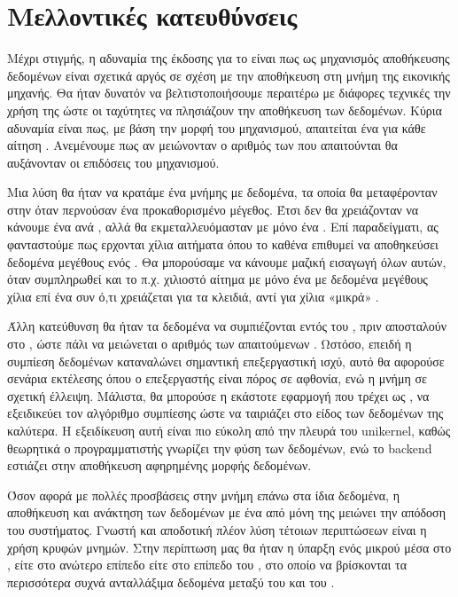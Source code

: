 \section{Μελλοντικές κατευθύνσεις}


Μέχρι στιγμής, η αδυναμία της έκδοσης  για το  είναι πως
ως μηχανισμός αποθήκευσης δεδομένων είναι σχετικά αργός σε σχέση
με την αποθήκευση στη μνήμη της εικονικής μηχανής. Θα ήταν δυνατόν
να βελτιστοποιήσουμε περαιτέρω με διάφορες τεχνικές την χρήση της
 ώστε οι ταχύτητες να πλησιάζουν την  αποθήκευση των
δεδομένων. Κύρια αδυναμία είναι πως, με βάση την μορφή του μηχανισμού,
απαιτείται ένα  για κάθε αίτηση . Ανεμένουμε πως αν
μειώνονταν ο αριθμός των  που απαιτούνται θα αυξάνονταν οι
επιδόσεις του μηχανισμού.
\newline

Μια λύση θα ήταν να κρατάμε ένα  μνήμης με δεδομένα, τα οποία
θα μεταφέρονταν στην  όταν περνούσαν ένα προκαθορισμένο
μέγεθος. Έτσι δεν θα χρειάζονταν να κάνουμε ένα  ανά
, αλλά θα εκμεταλλευόμασταν  με μόνο ένα
. Επί παραδείγματι, ας φανταστούμε πως ερχονται χίλια
αιτήματα  όπου το καθένα επιθυμεί να αποθηκεύσει δεδομένα
μεγέθους ενός .  Θα μπορούσαμε να κάνουμε μαζική
εισαγωγή όλων αυτών, όταν συμπληρωθεί και το π.χ. χιλιοστό αίτημα
με μόνο ένα  με δεδομένα μεγέθους χίλια επί ένα
 συν ό,τι χρειάζεται για τα κλειδιά, αντί για χίλια «μικρά» .
\newline

Άλλη κατεύθυνση θα ήταν τα δεδομένα να συμπιέζονται εντός του
, πριν αποσταλούν στο , ώστε πάλι να μειώνεται
ο αριθμός των απαιτούμενων . Ωστόσο, επειδή η συμπίεση
δεδομένων καταναλώνει σημαντική επεξεργαστική ισχύ, αυτό θα
αφορούσε σενάρια εκτέλεσης όπου ο επεξεργαστής είναι πόρος σε
αφθονία, ενώ η μνήμη σε σχετική έλλειψη. Μάλιστα, θα μπορούσε η
εκάστοτε εφαρμογή που τρέχει ως , να εξειδικεύει τον
αλγόριθμο συμπίεσης ώστε να ταιριάζει στο είδος των δεδομένων της καλύτερα.
Η εξειδίκευση αυτή είναι πιο εύκολη από την πλευρά του unikernel, καθώς θεωρητικά ο
προγραμματιστής γνωρίζει την φύση των δεδομένων, ενώ το backend εστιάζει στην αποθήκευση
αφηρημένης μορφής δεδομένων.
\newline

Όσον αφορά  με πολλές προσβάσεις στην μνήμη επάνω στα
ίδια δεδομένα, η
αποθήκευση και ανάκτηση των δεδομένων με ένα  από
μόνη της μειώνει την απόδοση του συστήματος. Γνωστή και
αποδοτική πλέον λύση
τέτοιων περιπτώσεων είναι η χρήση κρυφών μνημών. Στην περίπτωση
μας θα ήταν η ύπαρξη ενός μικρού  μέσα στο
, είτε στο ανώτερο επίπεδο είτε στο
επίπεδο του , στο οποίο να βρίσκονται τα περισσότερα συχνά
ανταλλάξιμα δεδομένα μεταξύ του  και του .
\newline

